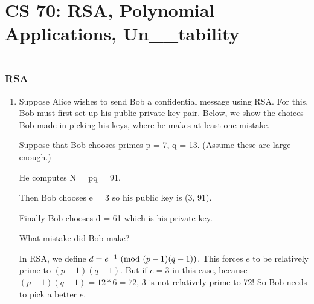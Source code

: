 \documentclass{article}
\begin{document}
    
    \part*{CS 70: RSA, Polynomial Applications, Un\_\_tability}
    \vspace{-7pt}
    \hrule
    \vspace{7pt}
    
    \section{RSA}
    \begin{enumerate}
        \item Suppose Alice wishes to send Bob a confidential message using RSA. For this, Bob must first set up his public-private key pair. Below, we show the choices Bob made in picking his keys, where he makes at least one mistake.
        
        Suppose that Bob chooses primes p = 7, q = 13. (Assume these are large enough.)
        
        He computes N = pq = 91.
        
        Then Bob chooses e = 3 so his public key is (3, 91).

        Finally Bob chooses d = 61 which is his private key.

        What mistake did Bob make?
        \begin{solution}
            In RSA, we define $d = e^{-1} \textnormal{ (mod } (p-1)(q-1))$. This forces $e$ to be relatively prime to $(p-1)(q-1)$. But if $e = 3$ in this case,
            because $(p-1)(q-1) = 12 * 6 = 72$, 3 is not relatively prime to 72! So Bob needs to pick a better $e$.
        \end{solution}
    \end{enumerate}
\end{document}
